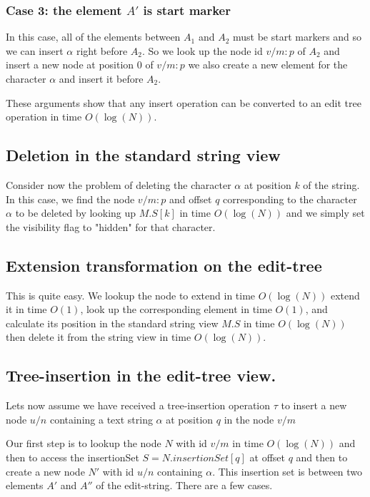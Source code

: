 \documentclass{amsart}
\begin{document}
\subsubsection{Case 3: the element $A'$ is start marker}
In this case, all of the elements between $A_1$ and $A_2$ must be start markers
and so we can insert $\alpha$ right before $A_2$.  So we look up the node id $v/m:p$ of $A_2$ and insert a new node at position $0$ of $v/m:p$ we also create a new element for the character $\alpha$ and insert it before $A_2$.

These arguments show that any insert operation can be converted to an edit tree operation in time $O(\log(N))$.



\subsection{Deletion in the standard string view}
Consider now the problem of deleting the character $\alpha$
 at position $k$ of the string.
In this case,
we find the node $v/m:p$ and offset $q$ corresponding to the character $\alpha$ to be deleted by looking up $M.S[k]$ in time $O(\log(N))$
and we simply set the visibility flag to "hidden" for that character.

\subsection{Extension transformation on the edit-tree}
This is quite easy. We lookup the node to extend in time $O(\log(N))$
extend it in time $O(1)$, look up the corresponding element in time $O(1)$,
and calculate its position in the standard string view $M.S$ in time $O(\log(N))$
then delete it from the string view in time $O(\log(N))$.

\subsection{Tree-insertion in the edit-tree view.}
Lets now assume we have received a tree-insertion operation $\tau$
to insert a new node $u/n$ containing a text string $\alpha$  
at position $q$ 
in the node $v/m$

Our first step is to lookup the node $N$ with id $v/m$ in time $O(\log(N))$
and then to access the insertionSet $S=N.insertionSet[q]$ at offset $q$
and then to create a new node $N'$ with id $u/n$ containing $\alpha$.
This insertion set is between two elements $A'$ and $A''$ of the edit-string.
There are a few cases.
\end{document}
